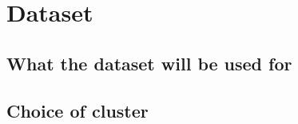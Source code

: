 \chapter{Dataset}
\label{ch:dataset}




\section{What the dataset will be used for}



\section{Choice of cluster}


